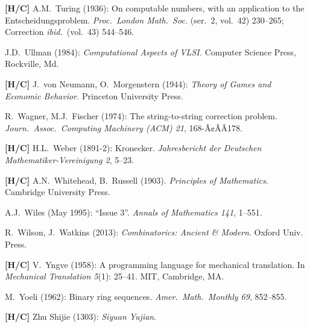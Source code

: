 \begin{thebibliography}{999}
{\bf [H/C]}
A.M.~Turing (1936): On computable numbers, with an application to the Entscheidungsproblem.  {\it Proc.~London Math.~Soc.} (ser.~2, vol.~42) 230--265; Correction {\it ibid.}~(vol.~43) 544--546.


J.D.~Ullman (1984): {\it Computational Aspects of VLSI.}  Computer Science Press, Rockville, Md.


{\bf [H/C]}
J.~von Neumann, O.~Morgenstern (1944): {\it Theory of Games and Economic Behavior.}
Princeton University Press.


R.~Wagner, M.J.~Fischer (1974): The string-to-string correction problem.
{\it Journ.~Assoc.~Computing Machinery (ACM) 21}, 168-Ã¢ÂÂ178.

{\bf [H/C]}
H.L.~Weber (1891-2): Kronecker.
{\it Jahresbericht der Deutschen Mathematiker-Vereinigung 2}, 5--23.

{\bf [H/C]}
A.N.~Whitehead, B.~Russell (1903).  {\it Principles of Mathematics}. Cambridge University Press. 

A.J.~Wiles (May 1995): ``Issue 3''.  {\it Annals of Mathematics 141}, 1--551.

R.~Wilson, J.~Watkins (2013):
{\it Combinatorics: Ancient \& Modern}.
Oxford Univ. Press.



{\bf [H/C]}
V.~Yngve (1958):  A programming language for mechanical translation.
In {\it Mechanical Translation 5}(1): 25--41.  MIT, Cambridge, MA.

M.~Yoeli (1962): Binary ring sequences.  {\it Amer.~Math.~Monthly 69}, 852--855.


{\bf [H/C]}
Zhu Shijie (1303): {\it Siyuan Yujian}.


\end{thebibliography}

